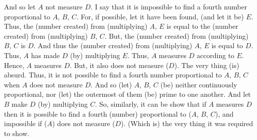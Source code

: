 \begin{Parallel}{}{}
{And so let $A$ not measure $D$. I say that it is impossible to find a fourth
number proportional to $A$, $B$, $C$. For, if possible, let it have
been found, (and let it be) $E$. Thus, the (number created) from
(multiplying) $A$, $E$ is equal to the (number created) from (multiplying)
$B$, $C$. But, the (number created) from (multiplying) $B$, $C$ is $D$.
And thus the (number created) from (multiplying) $A$, $E$ is equal to $D$.
Thus, $A$ has made $D$ (by) multiplying $E$. Thus, $A$ measures
$D$ according to $E$. Hence, $A$ measures $D$. But, it also does not
measure ($D$). The very thing (is) absurd. Thus, it is not possible
to find a fourth number proportional to $A$, $B$, $C$ when $A$ does not
measure $D$. And so (let) $A$, $B$, $C$ (be) neither continuously
proportional, nor (let) the outermost of them (be) prime to one another.
And let $B$ make $D$ (by) multiplying $C$. So, similarly, it can be show that
if $A$ measures $D$ then it is possible to find a fourth (number)
proportional to ($A$, $B$, $C$), and impossible if ($A$) does not measure ($D$).
(Which is) the very thing it was required to show.}
\end{Parallel}


\vspace{7pt}{\footnotesize\noindent$^\dag$ The proof of this proposition is incorrect.
There are, in fact, only two cases. Either $A$, $B$, $C$ are continuously
proportional,  with $A$ and $C$ prime to one another, or not. In the first case, 
it is impossible to find a fourth proportional number. In the second case,
it is possible to find a fourth proportional number provided that $A$
measures $B$ times $C$. Of the four cases considered by Euclid,
the proof given in the second case is incorrect, since it only demonstrates that
if $A:B::C:D$ then a number $E$ cannot be found such that $B:C::D:E$. The proofs given in the other three cases are correct.}

